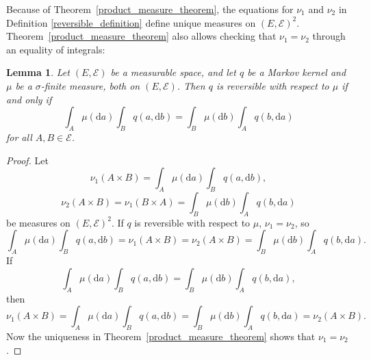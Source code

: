\documentclass[english,twoside,openright]{HYgraduMLDS}
\newtheorem{lemma}{Lemma}[chapter]
\newcommand{\dx}{\mathrm{d}}
\begin{document}
Because of Theorem~\ref{product_measure_theorem}, the equations for
\(\nu_{1}\) and \(\nu_{2}\) in Definition \ref{reversible_definition} define
unique measures on \((E, \mathcal{E})^{2}\). Theorem~\ref{product_measure_theorem}
also allows checking that \(\nu_{1} = \nu_{2}\) through an equality of
integrals:
\begin{lemma}\label{reversible_check_lemma}
	Let \((E, \mathcal{E})\) be a measurable space, and let \(q\) be a Markov
  kernel and \(\mu\) be a \(\sigma\)-finite measure, both on \((E, \mathcal{E})\).
  Then \(q\) is reversible with respect to \(\mu\) if and only if
  \[
    \int_{A}\mu(\dx a)\int_{B}q(a, \dx b)
    = \int_{B}\mu(\dx b)\int_{A}q(b, \dx a)
  \]
  for all \(A, B\in \mathcal{E}\).
\end{lemma}
\begin{proof}
  Let
  \[
    \nu_{1}(A\times B) = \int_{A}\mu(\dx a)\int_{B}q(a, \dx b),
  \]
  \[
    \nu_{2}(A\times B) = \nu_{1}(B\times A) = \int_{B}\mu(\dx b)\int_{A}q(b, \dx a)
  \]
  be measures on \((E, \mathcal{E})^{2}\). If \(q\) is reversible with respect to
  \(\mu\), \(\nu_{1} = \nu_{2}\), so
  \[
    \int_{A}\mu(\dx a)\int_{B}q(a, \dx b) = \nu_{1}(A\times B) = \nu_{2}(A\times B)
    = \int_{B}\mu(\dx b)\int_{A}q(b, \dx a).
  \]
  If
  \[
    \int_{A}\mu(\dx a)\int_{B}q(a, \dx b)
    = \int_{B}\mu(\dx b)\int_{A}q(b, \dx a),
  \]
  then
  \[
    \nu_{1}(A\times B) = \int_{A}\mu(\dx a)\int_{B}q(a, \dx b)
    = \int_{B}\mu(\dx b)\int_{A}q(b, \dx a) = \nu_{2}(A\times B).
  \]
  Now the uniqueness in Theorem~\ref{product_measure_theorem} shows that
  \(\nu_{1} = \nu_{2}\).
\end{proof}
\end{document}
